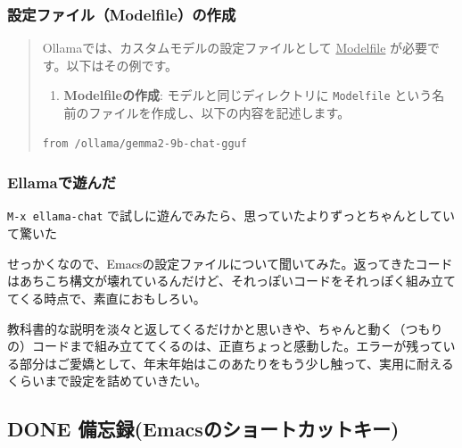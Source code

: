 \documentclass[11pt]{article}
\begin{document}
\subsubsection{設定ファイル（Modelfile）の作成}
\label{sec:orgc8f7cae}

\begin{quote}
Ollamaでは、カスタムモデルの設定ファイルとして \uline{Modelfile} が必要です。以下はその例です。

\begin{enumerate}
\item \textbf{Modelfileの作成}:
モデルと同じディレクトリに \texttt{Modelfile} という名前のファイルを作成し、以下の内容を記述します。
\end{enumerate}
\begin{verbatim}
from /ollama/gemma2-9b-chat-gguf
\end{verbatim}
\end{quote}
\subsubsection{Ellamaで遊んだ}
\label{sec:org9dfb271}

\texttt{M-x ellama-chat} で試しに遊んでみたら、思っていたよりずっとちゃんとしていて驚いた🤣

せっかくなので、Emacsの設定ファイルについて聞いてみた。返ってきたコードはあちこち構文が壊れているんだけど、それっぽいコードをそれっぽく組み立ててくる時点で、素直におもしろい。

教科書的な説明を淡々と返してくるだけかと思いきや、ちゃんと動く（つもりの）コードまで組み立ててくるのは、正直ちょっと感動した。エラーが残っている部分はご愛嬌として、年末年始はこのあたりをもう少し触って、実用に耐えるくらいまで設定を詰めていきたい。
\subsection{{\bfseries\sffamily DONE} 備忘録(Emacsのショートカットキー)}
\label{sec:org904f69a}
\end{document}
